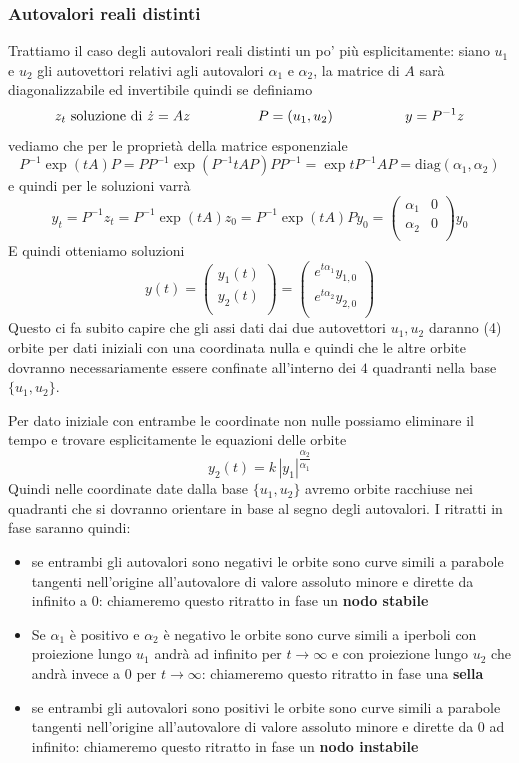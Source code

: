 \documentclass[11pt,a4paper,twoside]{book}
\theoremstyle{esss}
\theoremstyle{dotless}
\numberwithin{equation}{section} %
\begin{document}
\subsubsection{Autovalori reali distinti}
Trattiamo il caso degli autovalori reali distinti un po' più esplicitamente: siano $u_1$ e $u_2$ gli autovettori relativi agli autovalori $\alpha_1$ e $\alpha_2$, la matrice di $A$ sarà diagonalizzabile ed invertibile quindi se definiamo
\[
z_t \text{ soluzione di } \dot{z}=Az \hspace{0.14\linewidth} P=(u_1,u_2) \hspace{0.15\linewidth} y=P^{-1}z
\]
vediamo che per le proprietà della matrice esponenziale
\[
P^{-1}\exp{(tA)}P=PP^{-1}\exp{(P^{-1}tAP)}PP^{-1}=\exp{tP^{-1}AP}=\text{diag}(\alpha_1,\alpha_2)
\]
e quindi per le soluzioni varrà
\[
y_t=P^{-1}z_t=P^{-1}\exp{(tA)}z_0=P^{-1}\exp{(tA)}Py_0=\left( \begin{array}{cc}
\alpha_1 & 0\\ \alpha_2 &0\\
\end{array}\right) y_0
\]
E quindi otteniamo soluzioni
\[
y(t)=\left(\begin{array}{c}
y_1(t)\\
y_2(t)\\
\end{array}\right)=\left(\begin{array}{c}
e^{t\alpha_1}y_{1,0}\\
e^{t\alpha_2}y_{2,0}\\
\end{array}\right)
\]
Questo ci fa subito capire che gli assi dati dai due autovettori $u_1, u_2$ daranno (4) orbite per dati iniziali con una coordinata nulla e quindi che le altre orbite dovranno necessariamente essere confinate all'interno dei $4$ quadranti nella base $\{u_1,u_2\}$.

Per dato iniziale con entrambe le coordinate non nulle possiamo eliminare il tempo e trovare esplicitamente le equazioni delle orbite 
\[
y_2(t)=k\, |y_1|^{\dfrac{\alpha_2}{\alpha_1}}
\]
Quindi nelle coordinate date dalla base $\{u_1,u_2\}$ avremo orbite racchiuse nei quadranti che si dovranno orientare in base al segno degli autovalori.
I ritratti in fase saranno quindi:
\begin{itemize}
\item se entrambi gli autovalori sono negativi le orbite sono curve simili a parabole tangenti nell'origine all'autovalore di valore assoluto minore e dirette da infinito a 0: chiameremo questo ritratto in fase un \textbf{nodo stabile}
\item Se $\alpha_1$ è positivo e $\alpha_2$ è negativo le orbite sono curve simili a iperboli con proiezione lungo $u_1$ andrà ad infinito per $t\rightarrow \infty$ e con proiezione lungo $u_2$ che andrà invece a 0 per $t\rightarrow \infty$: chiameremo questo ritratto in fase una \textbf{sella}
\item se entrambi gli autovalori sono positivi le orbite sono curve simili a parabole tangenti nell'origine all'autovalore di valore assoluto minore e dirette da 0 ad infinito: chiameremo questo ritratto in fase un \textbf{nodo instabile}

\end{itemize}
\end{document}

